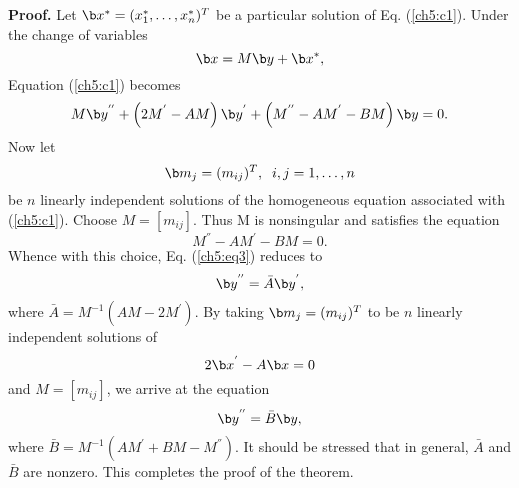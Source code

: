 {\bf Proof.}
Let $\b x^{*}=(x^{*}_{1},\ldots,x^{*}_{n})^T$ be a
particular solution of Eq. (\ref{ch5:c1}). Under the change of variables 
\begin{equation}
\b x=M\b y+\b x^{*}, \label{ch5:eq2} 
\end{equation}
Equation (\ref{ch5:c1}) becomes
\begin{equation}
M\b y^{''}+\left (2M^{'}-AM \right )\b y^{'}
+\left (M^{''}-AM^{'}-BM \right )\b y=0. \label{ch5:eq3} 
\end{equation}
Now let 
\[ \b m_j=(m_{ij})^T,\;\; i,j=1,\ldots ,n\]
be $n$ linearly independent solutions of the homogeneous equation associated
with (\ref{ch5:c1}).  Choose $M=[m_{ij}]$. Thus M is nonsingular and satisfies
the equation
\[M^{''}-AM^{'}-BM=0.\]
Whence with this choice, Eq. (\ref{ch5:eq3}) reduces to
\begin{equation}
\b y^{''}=\bar A \b y^{'}, \label{ch5:eq4}
\end{equation}
where $\bar A=M^{-1}(AM-2M^{'})$. By taking $\b m_j=(m_{ij})^T$ to be $n$ 
linearly independent solutions of
\[2\b x^{'}-A\b x=0\]
and $M=[m_{ij}]$, we arrive at the equation
\begin{equation}
\b y^{''}=\bar B \b y, \label{ch5:eq5}
\end{equation}
where $\bar B= M^{-1}(AM^{'}+BM-M^{''})$. It should be stressed that in general,
$\bar A $ and $\bar B$
are nonzero. This completes the proof of the theorem.

